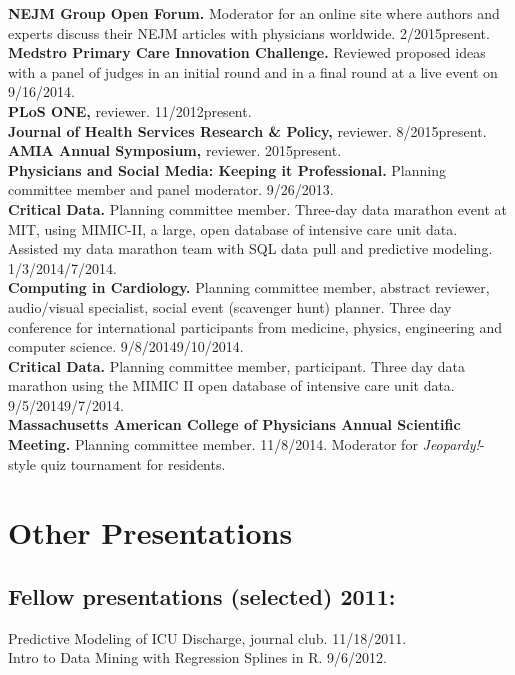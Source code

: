 \documentclass[12pt]{article}
\begin{document}
\textbf{NEJM Group Open Forum.} Moderator for an online site where
authors and experts discuss their NEJM articles with physicians
worldwide. 2/2015\ndash{}present.\\
\textbf{Medstro Primary Care Innovation Challenge.}
Reviewed proposed ideas with a panel of judges in an initial round and
in a final round at a live event on 9/16/2014.\\
\textbf{PLoS ONE,} reviewer. 11/2012\ndash{}present.\\
\textbf{Journal of Health Services Research \& Policy,} reviewer.
8/2015\ndash{}present.\\
\textbf{AMIA Annual Symposium,} reviewer. 2015\ndash{}present.\\
\textbf{Physicians and Social Media: Keeping it Professional.} Planning
committee member and panel moderator. 9/26/2013.\\
\textbf{Critical Data.} Planning committee member. Three-day data
marathon event at MIT, using MIMIC-II, a large, open database of
intensive care unit data. Assisted my data marathon team with SQL data
pull and predictive modeling. 1/3/2014\ndash{}/7/2014.\\
\textbf{Computing in Cardiology.} Planning committee member, abstract
reviewer, audio/visual specialist, social event (scavenger hunt)
planner. Three day conference for international participants from
medicine, physics, engineering and computer science.
9/8/2014\ndash{}9/10/2014.\\
\textbf{Critical Data.} Planning committee member, participant. Three
day data marathon using the MIMIC II open database of intensive care
unit data. 9/5/2014\ndash{}9/7/2014.\\
\textbf{Massachusetts American College of Physicians Annual Scientific
  Meeting.} Planning committee member. 11/8/2014. Moderator for
\emph{Jeopardy!}-style quiz tournament for residents.

\section*{Other Presentations}

\subsection*{Fellow presentations (selected) 2011:}
Predictive Modeling of ICU Discharge, journal club. 11/18/2011.\\
Intro to Data Mining with Regression Splines in R. 9/6/2012.
\end{document}
